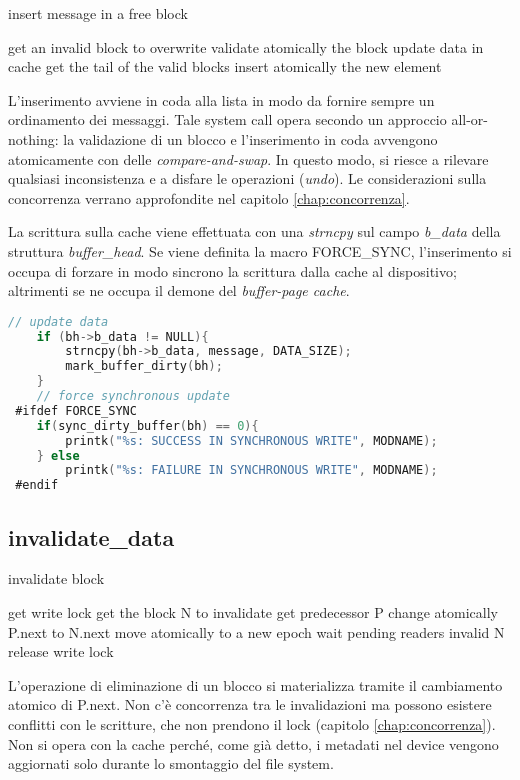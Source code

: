 \documentclass[a4paper,12pt,oneside]{book}
\begin{document}
\begin{algorithm}[H]
\caption{insert message in a free block}
\begin{algorithmic}
    	\State get an invalid block to overwrite
    	\State validate atomically the block
    	\State update data in cache
    	\State get the tail of the valid blocks
    	\State insert atomically the new element
    \EndIf
\end{algorithmic}
\end{algorithm}
	L'inserimento avviene in coda alla lista in modo da fornire sempre un ordinamento dei messaggi. Tale system call opera secondo un approccio all-or-nothing: la validazione di un blocco e l'inserimento in coda avvengono atomicamente con delle \emph{compare-and-swap}. In questo modo, si riesce a rilevare qualsiasi inconsistenza e a disfare le operazioni (\emph{undo}).  Le considerazioni sulla concorrenza verrano approfondite nel capitolo \ref{chap:concorrenza}.

\par La scrittura sulla cache viene effettuata con una \emph{strncpy} sul campo \emph{b\_data} della struttura \emph{buffer\_head}. Se viene definita la macro FORCE\_SYNC, l'inserimento si occupa di forzare in modo sincrono la scrittura dalla cache al dispositivo; altrimenti se ne occupa il demone del \emph{buffer-page cache}.
\begin{lstlisting}[language=C]
	// update data
	if (bh->b_data != NULL){ 
		strncpy(bh->b_data, message, DATA_SIZE);  
		mark_buffer_dirty(bh);
	}
	// force synchronous update
 #ifdef FORCE_SYNC 
	if(sync_dirty_buffer(bh) == 0){
		printk("%s: SUCCESS IN SYNCHRONOUS WRITE", MODNAME);
	} else
		printk("%s: FAILURE IN SYNCHRONOUS WRITE", MODNAME);
 #endif
\end{lstlisting}



	\subsection{invalidate\_data}

\begin{algorithm}[H]
\caption{invalidate block}
\begin{algorithmic}
    	\State get write lock
    	\State get the block N to invalidate
		\State get predecessor P
		\State change atomically P.next to N.next
		\State move atomically to a new epoch
		\State wait pending readers
		\State invalid N
	\EndIf
    	\State release write lock
    \EndIf
\end{algorithmic}
\end{algorithm}
L'operazione di eliminazione di un blocco si materializza tramite il cambiamento atomico di P.next. Non c'è concorrenza tra le invalidazioni ma possono esistere conflitti con le scritture, che non prendono il lock (capitolo \ref{chap:concorrenza}). Non si opera con la cache perché, come già detto, i metadati nel device vengono aggiornati solo durante lo smontaggio del file system. 
		
\end{document}
